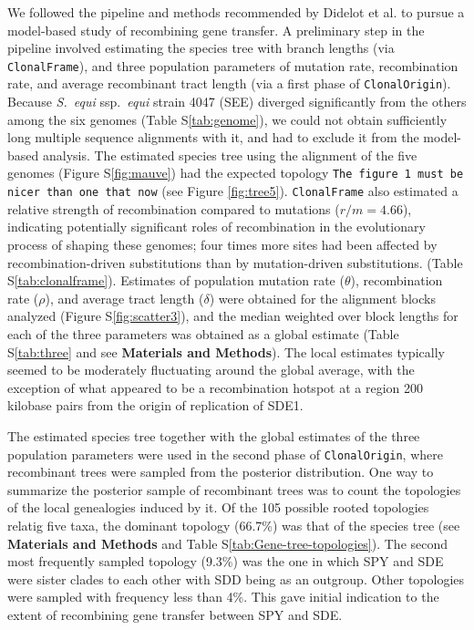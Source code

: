 \documentclass[10pt]{article}
\begin{document}
We followed the pipeline and methods recommended by Didelot et al.
\cite{Didelot2010} to pursue a model-based study of recombining gene transfer. A
preliminary step in the pipeline involved estimating the species tree with
branch lengths (via \texttt{ClonalFrame}), and three population parameters of
mutation rate, recombination rate, and average recombinant tract length (via a
first phase of \texttt{ClonalOrigin}).  Because \textit{S.\ equi} ssp.\textit{\
equi} strain 4047 (SEE) diverged significantly from the others among the six
genomes (Table S\ref{tab:genome}), we could not obtain sufficiently long
multiple sequence alignments with it, and had to exclude it from the model-based
analysis.  The estimated species tree using the alignment of the five genomes
(Figure S\ref{fig:mauve}) had the expected topology \texttt{The figure 1 must be
nicer than one that now} (see Figure \ref{fig:tree5}). \texttt{ClonalFrame} also
estimated a relative strength of recombination compared to mutations
($r/m=4.66$), indicating potentially significant roles of recombination in the
evolutionary process of shaping these genomes; four times more sites had been
affected by recombination-driven substitutions than by mutation-driven
substitutions.  (Table S\ref{tab:clonalframe}).  Estimates of population
mutation rate ($\theta$), recombination rate ($\rho$), and average tract length
($\delta$) were obtained for the alignment blocks analyzed (Figure
S\ref{fig:scatter3}), and the median weighted over block lengths for each of the
three parameters was obtained as a global estimate (Table S\ref{tab:three} and
see \textbf{Materials and Methods}).  The local estimates typically seemed to be
moderately fluctuating around the global average, with the exception of what
appeared to be a recombination hotspot at a region 200 kilobase pairs from the
origin of replication of SDE1.  

The estimated species tree together with the global estimates of the three
population parameters were used in the second phase of \texttt{ClonalOrigin},
where recombinant trees were sampled from the posterior distribution. One way to
summarize the posterior sample of recombinant trees was to count the topologies
of the local genealogies induced by it. Of the 105 possible rooted topologies
relatig five taxa, the dominant topology (66.7\%) was that of the species tree
(see \textbf{Materials and Methods} and Table S\ref{tab:Gene-tree-topologies}).
The second most frequently sampled topology (9.3\%) was the one in which SPY and
SDE were sister clades to each other with SDD being as an outgroup. Other
topologies were sampled with frequency less than 4\%. This gave initial
indication to the extent of recombining gene transfer  between SPY and SDE.
\end{document}
